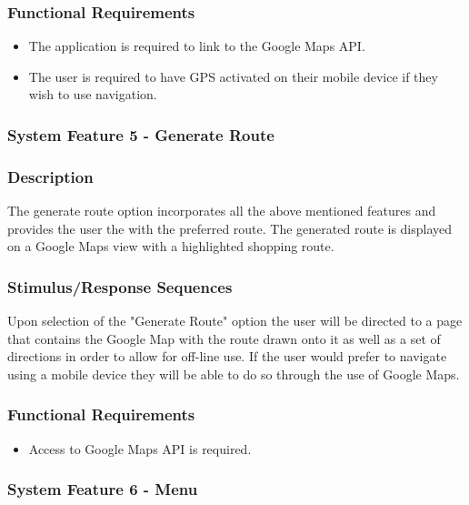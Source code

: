 \documentclass[10pt, a4paper, onecolumn]{scrartcl}
\begin{document}
			\subsubsection*{Functional Requirements}
			
				\begin{itemize}
					\item The application is required to link to the Google Maps API. 
					\item The user is required to have GPS activated on their mobile device if they wish to use navigation.
				\end{itemize}
		
		\subsubsection{System Feature 5 - Generate Route}
		
			\subsubsection*{Description}
			
				The generate route option incorporates all the above mentioned features and provides the user the with the preferred route. The generated route is displayed on a Google Maps view with a highlighted shopping route. 
				
			\subsubsection*{Stimulus/Response Sequences}
			
				Upon selection of the "Generate Route" option the user will be directed to a page that contains the Google Map with the route drawn onto it as well as a set of directions in order to allow for off-line use. If the user would prefer to navigate using a mobile device they will be able to do so through the use of Google Maps.
				
			\subsubsection*{Functional Requirements}
			
				\begin{itemize}
					\item Access to Google Maps API is required.
				\end{itemize}
				
		\subsubsection{System Feature 6 - Menu}
		
\end{document}
